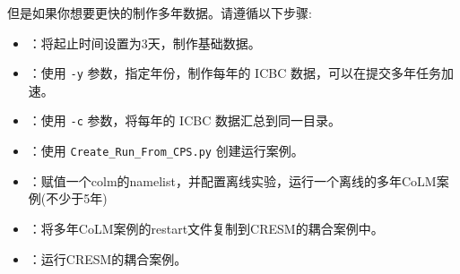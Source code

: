 \documentclass[UTF8,a4paper,11pt,fontset=none]{ctexart}
\begin{document}
但是如果你想要更快的制作多年数据。请遵循以下步骤:
\begin{itemize}[leftmargin=4em]
    \item {}：将起止时间设置为3天，制作基础数据。
    \item {}：使用 \texttt{-y} 参数，指定年份，制作每年的 ICBC 数据，可以在提交多年任务加速。
    \item {}：使用 \texttt{-c} 参数，将每年的 ICBC 数据汇总到同一目录。
    \item {}：使用 \texttt{Create\_Run\_From\_CPS.py} 创建运行案例。
    \item {}：赋值一个colm的namelist，并配置离线实验，运行一个离线的多年CoLM案例(不少于5年)
    \item {}：将多年CoLM案例的restart文件复制到CRESM的耦合案例中。
    \item {}：运行CRESM的耦合案例。
\end{itemize}
\end{document}
